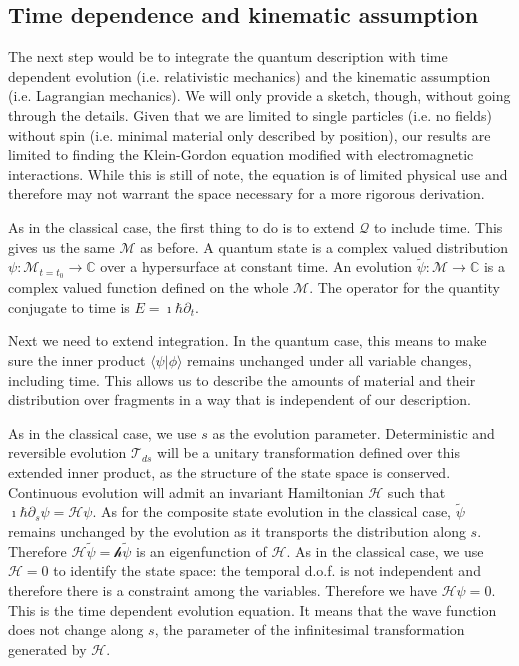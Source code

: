 \documentclass[smallextended]{svjour3}
\numberwithin{equation}{section}
\begin{document}
\subsection{Time dependence and kinematic assumption}

The next step would be to integrate the quantum description with time dependent evolution (i.e. relativistic mechanics) and the kinematic assumption (i.e. Lagrangian mechanics). We will only provide a sketch, though, without going through the details. Given that we are limited to single particles (i.e. no fields) without spin (i.e. minimal material only described by position), our results are limited to finding the Klein-Gordon equation modified with electromagnetic interactions. While this is still of note, the equation is of limited physical use and therefore may not warrant the space necessary for a more rigorous derivation.

As in the classical case, the first thing to do is to extend $\mathcal{Q}$ to include time. This gives us the same $\mathcal{M}$ as before. A quantum state is a complex valued distribution $\psi : \mathcal{M}_{t=t_0} \rightarrow \mathbb{C}$ over a hypersurface at constant time. An evolution $\widetilde{\psi} : \mathcal{M} \rightarrow \mathbb{C}$ is a complex valued function defined on the whole $\mathcal{M}$. The operator for the quantity conjugate to time is $E=\imath\hbar\partial_t$.

Next we need to extend integration. In the quantum case, this means to make sure the inner product $\langle \psi | \phi \rangle$ remains unchanged under all variable changes, including time. This allows us to describe the amounts of material and their distribution over fragments in a way that is independent of our description.

As in the classical case, we use $s$ as the evolution parameter. Deterministic and reversible evolution $\mathcal{T}_{ds}$ will be a unitary transformation defined over this extended inner product, as the structure of the state space is conserved. Continuous evolution will admit an invariant Hamiltonian $\mathcal{H}$ such that $\imath \hbar \partial_s \psi = \mathcal{H} \psi$. As for the composite state evolution in the classical case, $\widetilde{\psi}$ remains unchanged by the evolution as it transports the distribution along $s$. Therefore $\mathcal{H} \widetilde{\psi} = \mathcal{h} \widetilde{\psi}$ is an eigenfunction of $\mathcal{H}$. As in the classical case, we use $\mathcal{H}=0$ to identify the state space: the temporal d.o.f. is not independent and therefore there is a constraint among the variables. Therefore we have $\mathcal{H} \psi = 0$. This is the time dependent evolution equation. It means that the wave function does not change along $s$, the parameter of the infinitesimal transformation generated by $\mathcal{H}$.
\end{document}
